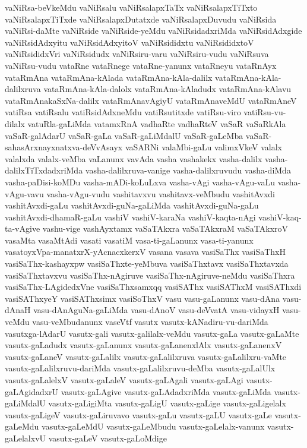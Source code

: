 {vaNiRsa-beVkeMdu
vaNiRsalu
vaNiRsalapxTaTx
vaNiRsalapxTiTxto
vaNiRsalapxTiTxde
vaNiRsalapxDutatxde
vaNiRsalapxDuvudu
vaNiRsida
vaNiRsi-daMte
vaNiRside
vaNiRside-yeMdu
vaNiRsidadxriMda
vaNiRsidAdxgide
vaNiRsidAdxyitu
vaNiRsidAdxyitoV
vaNiRsididxtu
vaNiRsididxtoV
vaNiRsididxVri
vaNiRsidudx
vaNiRsiru-varu
vaNiRsiru-vudu
vaNiRsuva
vaNiRsu-vudu
vataRne
vataRnege
vataRne-yanunx
vataRneyu
vataRnAyx
vataRmAna
vataRmAna-kAlada
vataRmAna-kAla-dalilx
vataRmAna-kAla-dalilxruva
vataRmAna-kAla-dalolx
vataRmAna-kAladudx
vataRmAna-kAlavu
vataRmAnakaSxNa-dalilx
vataRmAnavAgiyU
vataRmAnaveMdU
vataRmAneV
vatiRsa
vatiRsalu
vatiRsidAdxneMdu
vatiRsutitxde
vatiRsu-viro
vatiRsu-vu-dilalx
vatuRla-gaLiMda
vatamxRnA
vadhaRte
vadhaRteV
vaSaR
vaSaRkAla
vaSaR-galAdarU
vaSaR-gaLa
vaSaR-gaLiMdalU
vaSaR-gaLeMba
vaSaR-sahasArxnayxnatxva-deVvAsayx
vaSARNi
valaMbi-gaLu
valimxVkeV
valalx
valalxda
valalx-veMba
vaLanunx
vavAda
vasha
vashakekx
vasha-dalilx
vasha-dalilxTiTxdadxriMda
vasha-dalilxruva-vanige
vasha-dalilxruvudu
vasha-diMda
vasha-paDisi-koMDu
vasha-mADi-koLuLxva
vasha-vAgi
vasha-vAgu-vaLu
vasha-vAgu-vavu
vasha-vAgu-vudu
vashitavxvu
vashitavx-veMbudu
vashitAvxdi
vashitAvxdi-gaLu
vashitAvxdi-guNa-gaLiMda
vashitAvxdi-guNa-gaLu
vashitAvxdi-dhamaR-gaLu
vashiV
vashiV-karaNa
vashiV-kaqta-nAgi
vashiV-kaq-ta-vAgive
vashu-vige
vashAyxtamx
vaSaTAkxra
vaSaTAkxraM
vaSaTAkxroV
vasaMta
vasaMtAdi
vasati
vasatiM
vasa-ti-gaLanunx
vasa-ti-yanunx
vasatoyxVpa-manatxrX-yAcnacxkerxV
vasana
vasava
vasiSaThx
vasiSaThxH
vasiSaThx-kashayxpw
vasiSaThxte-yeMbuva
vasiSaThxtavx
vasiSaThxtavxda
vasiSaThxtavxvu
vasiSaThx-nAgiruve
vasiSaThx-nAgiruve-neMdu
vasiSaThxra
vasiSaThx-LAgidedxVne
vasiSaThxsamxqq
vasiSAThx
vasiSAThxM
vasiSAThxdi
vasiSAThxyeY
vasiSAThxsimx
vasiSoThxV
vasu
vasu-gaLanunx
vasu-dAna
vasu-dAnaH
vasu-dAnAguNa-gaLiMda
vasu-dAnoV
vasu-deVvatA
vasu-vidayxH
vasu-veMdu
vasu-veMbudanunx
vaseVtf
vasutx
vasutx-kANadiru-vu-dariMda
vasutxga-lAdarU
vasutx-gali
vasutx-galilalx-veMdu
vasutx-gaLa
vasutx-gaLaMte
vasutx-gaLadudx
vasutx-gaLanunx
vasutx-gaLanenxlAlx
vasutx-gaLanenxV
vasutx-gaLaneV
vasutx-gaLalilx
vasutx-gaLalilxruva
vasutx-gaLalilxru-vaMte
vasutx-gaLalilxruvu-dariMda
vasutx-gaLalilxruvu-deMba
vasutx-gaLalUlx
vasutx-gaLalelxV
vasutx-gaLaleV
vasutx-gaLAgali
vasutx-gaLAgi
vasutx-gaLAgidadxrU
vasutx-gaLAgive
vasutx-gaLAdadxriMda
vasutx-gaLiMda
vasutx-gaLiMdalU
vasutx-gaLigiMta
vasutx-gaLigU
vasutx-gaLige
vasutx-gaLigelalx
vasutx-gaLigeV
vasutx-gaLiruvavo
vasutx-gaLu
vasutx-gaLU
vasutx-gaLe
vasutx-gaLeMdu
vasutx-gaLeMdU
vasutx-gaLeMbudu
vasutx-gaLelalx-vanunx
vasutx-gaLelalxvU
vasutx-gaLeV
vasutx-gaLoMdige
}
